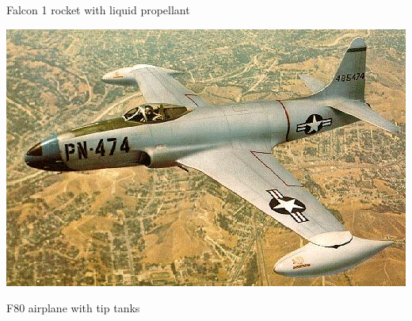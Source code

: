 \documentclass{beamer}
\begin{document}
{\begin{minipage}{0.48\textwidth}
  \small Falcon 1 rocket with liquid propellant
\end{minipage}
\begin{minipage}{0.48\textwidth}
  \centering
  \includegraphics[width=0.8\linewidth]{figures/f80.jpg}
  
  \small
  F80 airplane with tip tanks
\end{minipage}

}
\end{document}
